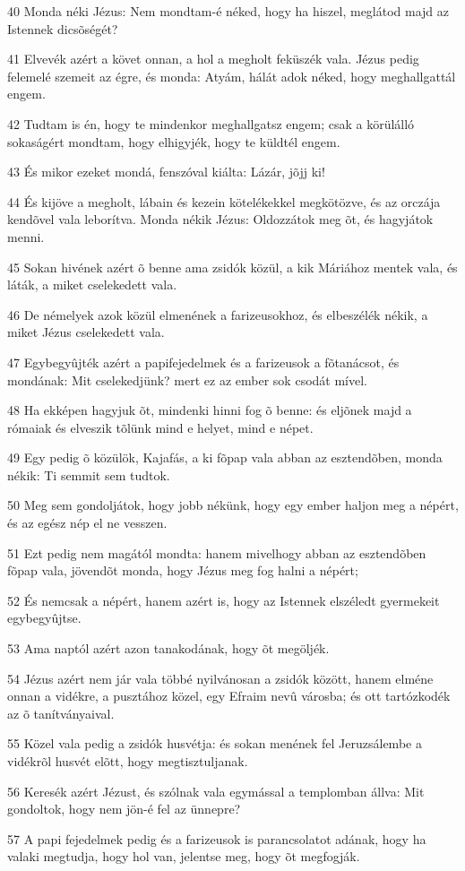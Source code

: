\par 40 Monda néki Jézus: Nem mondtam-é néked, hogy ha hiszel, meglátod majd az Istennek dicsõségét?
\par 41 Elvevék azért a követ onnan, a hol a megholt feküszék vala. Jézus pedig felemelé szemeit az égre, és monda: Atyám, hálát adok néked, hogy meghallgattál engem.
\par 42 Tudtam is én, hogy te mindenkor meghallgatsz engem; csak a körülálló sokaságért mondtam, hogy elhigyjék, hogy te küldtél engem.
\par 43 És mikor ezeket mondá, fenszóval kiálta: Lázár, jõjj ki!
\par 44 És kijöve a megholt, lábain és kezein kötelékekkel megkötözve, és az orczája kendõvel vala leborítva. Monda nékik Jézus: Oldozzátok meg õt, és hagyjátok menni.
\par 45 Sokan hivének azért õ benne ama zsidók közül, a kik Máriához mentek vala, és láták, a miket cselekedett vala.
\par 46 De némelyek azok közül elmenének a farizeusokhoz, és elbeszélék nékik, a miket Jézus cselekedett vala.
\par 47 Egybegyûjték azért a papifejedelmek és a farizeusok a fõtanácsot, és mondának: Mit cselekedjünk? mert ez az ember sok csodát mível.
\par 48 Ha ekképen hagyjuk õt, mindenki hinni fog õ benne: és eljõnek majd a rómaiak és elveszik tõlünk mind e helyet, mind e népet.
\par 49 Egy pedig õ közülök, Kajafás, a ki fõpap vala abban az esztendõben, monda nékik: Ti semmit sem tudtok.
\par 50 Meg sem gondoljátok, hogy jobb nékünk, hogy egy ember haljon meg a népért, és az egész nép el ne vesszen.
\par 51 Ezt pedig nem magától mondta: hanem mivelhogy abban az esztendõben fõpap vala, jövendõt monda, hogy Jézus meg fog halni a népért;
\par 52 És nemcsak a népért, hanem azért is, hogy az Istennek elszéledt gyermekeit egybegyûjtse.
\par 53 Ama naptól azért azon tanakodának, hogy õt megöljék.
\par 54 Jézus azért nem jár vala többé nyilvánosan a zsidók között, hanem elméne onnan a vidékre, a pusztához közel, egy Efraim nevû városba; és ott tartózkodék az õ tanítványaival.
\par 55 Közel vala pedig a zsidók husvétja: és sokan menének fel Jeruzsálembe a vidékrõl husvét elõtt, hogy megtisztuljanak.
\par 56 Keresék azért Jézust, és szólnak vala egymással a templomban állva: Mit gondoltok, hogy nem jön-é fel az ünnepre?
\par 57 A papi fejedelmek pedig és a farizeusok is parancsolatot adának, hogy ha valaki megtudja, hogy hol van, jelentse meg, hogy õt megfogják.

